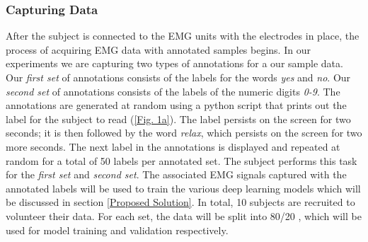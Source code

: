 \documentclass[conference]{IEEEtran}
\begin{document}
\subsubsection*{Capturing Data}
After the subject is connected to the EMG units with the electrodes in place, the process of acquiring EMG data with annotated samples begins. In our experiments we are capturing two types of annotations for a our sample data. Our \textit{first set} of annotations consists of the labels for the words \textit{yes} and \textit{no}. Our \textit{second set} of annotations consists of the labels of the numeric digits \textit{0-9}. The annotations are generated at random using a python script that prints out the label for the subject to read  (\figurename \ref{Fig. 1a}). The label persists on the screen for two seconds; it is then followed by the word \textit{relax}, which persists on the screen for two more seconds. The next label in the annotations is displayed and repeated at random for a total of 50 labels per annotated set. The subject performs this task for the \textit{first set} and \textit{second set}. The associated EMG signals captured with the annotated labels will be used to train the various deep learning models which will be discussed in section \ref{Proposed Solution}. In total, 10 subjects are recruited to volunteer their data. For each set, the data will be split into 80/20 , which will be used for model training and validation respectively. 
\end{document}
